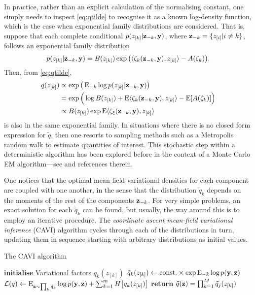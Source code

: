 In practice, rather than an explicit calculation of the normalising constant, one simply needs to inspect \cref{eq:qtilde} to recognise it as a known log-density function, which is the case when exponential family distributions are considered.
That is, suppose that each complete conditional $p(z_{[k]}|{\mathbf z}_{-k}, {\mathbf y})$, where ${\mathbf z}_{-k} = \{z_{[i]} | i \neq k\}$, follows an exponential family distribution
\[
  p(z_{[k]}| {\mathbf z}_{-k}, {\mathbf y} ) 
  = B(z_{[k]})\exp \big(\langle\zeta_k({\mathbf z}_{-k}, {\mathbf y}) , z_{[k]}\rangle - A(\zeta_k) \big).
\]
Then, from \cref{eq:qtilde},
\begin{align*}
  \tilde q(z_{[k]})
  &\propto \exp\big(\operatorname{E}_{-k}\log p(z_{[k]}| {\mathbf z}_{-k}, {\mathbf y}) \big) \\
  &= \exp \Big(\log B(z_{[k]}) + \operatorname{E} \langle\zeta_k({\mathbf z}_{-k}, {\mathbf y}) , z_{[k]}\rangle - \operatorname{E} [ A(\zeta_k) ] \Big) \\
  &\propto B(z_{[k]})\exp \operatorname{E}\langle\zeta_\xi({\mathbf z}_{-k}, {\mathbf y}) , z_{[k]}\rangle
\end{align*}
is also in the same exponential family.
In situations where there is no closed form expression for $\tilde q$, then one resorts to sampling methods such as a Metropolis random walk to estimate quantities of interest.
This stochastic step within a deterministic algorithm has been explored before in the context of a Monte Carlo EM algorithm---see \citet[§4, pp. 537--538]{meng1997algorithm} and references therein.

One notices that the optimal mean-field variational densities for each component are coupled with one another, in the sense that the distribution $\tilde q_k$ depends on the moments of the rest of the components ${\mathbf z}_{-k}$.
For very simple problems, an exact solution for each $\tilde q_k$ can be found, but usually, the way around this is to employ an iterative procedure.
The \emph{coordinate ascent mean-field variational inference} (CAVI) algorithm cycles through each of the distributions in turn, updating them in sequence starting with arbitrary distributions as initial values.

\begin{algorithm}[H]
\caption{The CAVI algorithm}\label{alg:cavi}
  \begin{algorithmic}[1]
    \State \textbf{initialise} Variational factors $q_k(z_{[k]})$
        \State $\tilde q_k(z_{[k]}) \gets \text{const.}\hspace{0.01em} \times \exp\operatorname{E}_{-k}\log p({\mathbf y},{\mathbf z})$ 
      \EndFor
      \State ${\mathcal L}(q) \gets \operatorname{E}_{{\mathbf z} \sim \prod_k\tilde q_k}\log p({\mathbf y}, {\mathbf z}) + \sum_{k=1}^m H\big[ q_k(z_{[k]})\big]$ 
    \EndWhile
    \State \textbf{return} $\tilde q({\mathbf z}) = \prod_{k=1}^M \tilde q_j(z_{[k]})$ 
  \end{algorithmic}
\end{algorithm}

